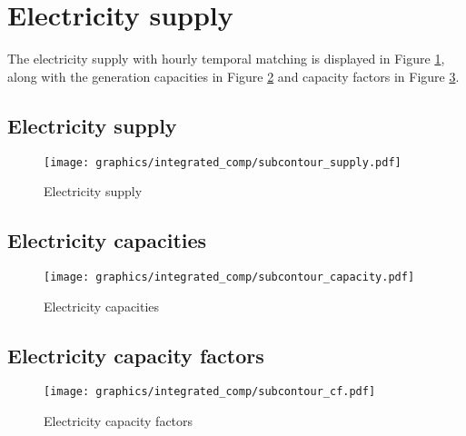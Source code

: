 
\clearpage

\section{Electricity supply}

The electricity supply with hourly temporal matching is displayed in Figure \ref{fig:supply}, along with the generation capacities
in Figure \ref{fig:el-cap} and capacity factors in Figure  \ref{fig:el_cf}.

\subsection{Electricity supply}
\label{subsec:el-supply}

\begin{figure}[h]
    \centering
    \texttt{[image: graphics/integrated\_comp/subcontour\_supply.pdf]}
    \caption{Electricity supply}
    \label{fig:supply}
\end{figure}

\subsection{Electricity capacities}
\label{subsec:el-cap}

\begin{figure}[h]
    \centering
    \texttt{[image: graphics/integrated\_comp/subcontour\_capacity.pdf]}
    \caption{Electricity capacities}
    \label{fig:el-cap}
\end{figure}

\subsection{Electricity capacity factors}
\label{subsec:el-cf}

\begin{figure}[h]
    \centering
    \texttt{[image: graphics/integrated\_comp/subcontour\_cf.pdf]}
    \caption{Electricity capacity factors}
    \label{fig:el_cf}
\end{figure}



